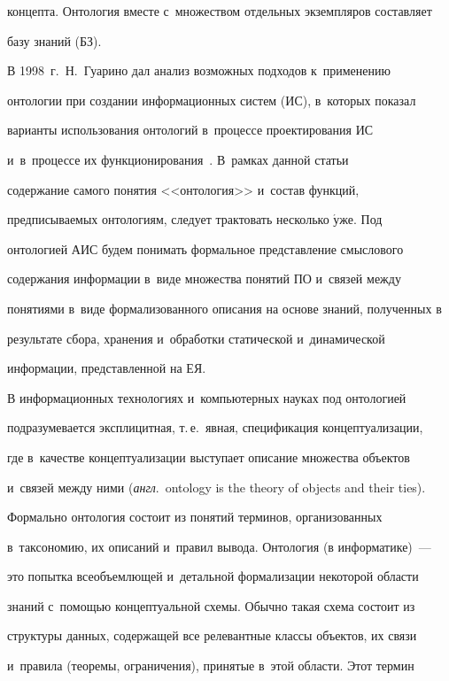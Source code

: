 концепта. Онтология вместе с~множеством отдельных экземпляров составляет 


базу знаний (БЗ).


  


  В 1998~г.\ Н.~Гуарино дал анализ возможных подходов к~применению 


онтологии при создании информационных систем (ИС), в~которых показал 


варианты использования онтологий в~процессе проектирования ИС 


и~в~процессе их функционирования~\cite{16-rod}. В~рамках данной статьи 


содержание самого понятия <<онтология>> и~состав функций, 


предписываемых онтологиям, следует трактовать несколько $\acute{\mbox{у}}$же. Под 


онтологией АИС будем понимать формальное представление смыслового 


содержания информации в~виде множества понятий ПО и~связей между 


понятиями в~виде формализованного описания на основе знаний, полученных в~


результате сбора, хранения и~обработки статической и~динамической 


информации, представленной на ЕЯ.


  


  В информационных технологиях и~компьютерных науках под онтологией 


подразумевается эксплицитная, т.\,е.\ явная, спецификация концептуализации, 


где в~качестве концептуализации выступает описание множества объектов 


и~связей между ними (\textit{англ}.\ ontology is the theory of objects and their ties). 


Формально онтология состоит из понятий терминов, организованных 


в~таксономию, их описаний и~правил вывода. Онтология (в информатике)~--- 


это попытка всеобъемлющей и~детальной формализации некоторой области 


знаний с~помощью концептуальной схемы. Обычно такая схема состоит из 


структуры данных, содержащей все релевантные классы объектов, их связи 


и~правила (теоремы, ограничения), принятые в~этой области. Этот термин 


